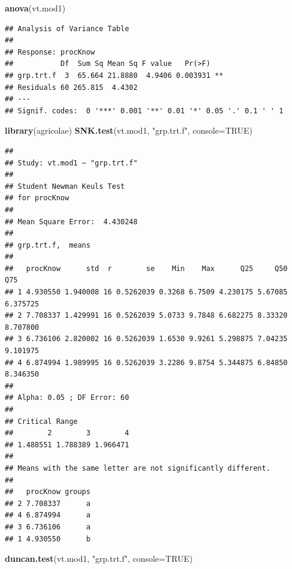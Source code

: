 \documentclass[
]{book}
\newenvironment{Shaded}{\begin{snugshade}}{\end{snugshade}}
\newcommand{\AttributeTok}[1]{\textcolor[rgb]{0.13,0.29,0.53}{#1}}
\newcommand{\ConstantTok}[1]{\textcolor[rgb]{0.56,0.35,0.01}{#1}}
\newcommand{\FunctionTok}[1]{\textcolor[rgb]{0.13,0.29,0.53}{\textbf{#1}}}
\newcommand{\NormalTok}[1]{#1}
\newcommand{\StringTok}[1]{\textcolor[rgb]{0.31,0.60,0.02}{#1}}
\begin{document}
\begin{Shaded}
\begin{Highlighting}[]
\FunctionTok{anova}\NormalTok{(vt.mod1)}
\end{Highlighting}
\end{Shaded}

\begin{verbatim}
## Analysis of Variance Table
## 
## Response: procKnow
##           Df  Sum Sq Mean Sq F value   Pr(>F)   
## grp.trt.f  3  65.664 21.8880  4.9406 0.003931 **
## Residuals 60 265.815  4.4302                    
## ---
## Signif. codes:  0 '***' 0.001 '**' 0.01 '*' 0.05 '.' 0.1 ' ' 1
\end{verbatim}

\begin{Shaded}
\begin{Highlighting}[]
\FunctionTok{library}\NormalTok{(agricolae)}
\FunctionTok{SNK.test}\NormalTok{(vt.mod1, }\StringTok{"grp.trt.f"}\NormalTok{, }\AttributeTok{console=}\ConstantTok{TRUE}\NormalTok{)}
\end{Highlighting}
\end{Shaded}

\begin{verbatim}
## 
## Study: vt.mod1 ~ "grp.trt.f"
## 
## Student Newman Keuls Test
## for procKnow 
## 
## Mean Square Error:  4.430248 
## 
## grp.trt.f,  means
## 
##   procKnow      std  r        se    Min    Max      Q25     Q50      Q75
## 1 4.930550 1.940008 16 0.5262039 0.3268 6.7509 4.230175 5.67085 6.375725
## 2 7.708337 1.429991 16 0.5262039 5.0733 9.7848 6.682275 8.33320 8.707800
## 3 6.736106 2.820002 16 0.5262039 1.6530 9.9261 5.298875 7.04235 9.101975
## 4 6.874994 1.989995 16 0.5262039 3.2286 9.8754 5.344875 6.84850 8.346350
## 
## Alpha: 0.05 ; DF Error: 60 
## 
## Critical Range
##        2        3        4 
## 1.488551 1.788389 1.966471 
## 
## Means with the same letter are not significantly different.
## 
##   procKnow groups
## 2 7.708337      a
## 4 6.874994      a
## 3 6.736106      a
## 1 4.930550      b
\end{verbatim}

\begin{Shaded}
\begin{Highlighting}[]
\FunctionTok{duncan.test}\NormalTok{(vt.mod1, }\StringTok{"grp.trt.f"}\NormalTok{, }\AttributeTok{console=}\ConstantTok{TRUE}\NormalTok{)}
\end{Highlighting}
\end{Shaded}
\end{document}
